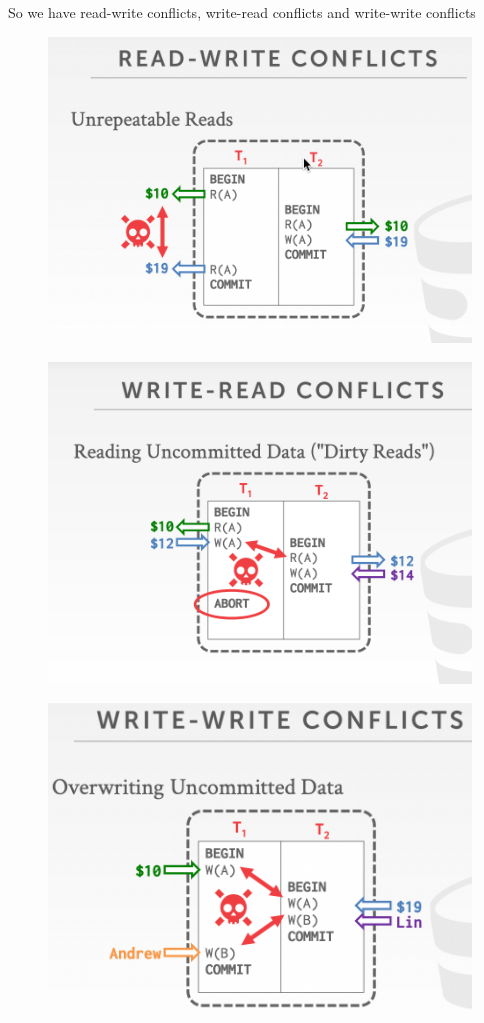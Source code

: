 \documentclass[11pt]{article}
\begin{document}
So we have read-write conflicts, write-read conflicts and write-write conflicts
\begin{figure}[htbp]
\centering
\includegraphics[width=.7\textwidth]{../images/15445/49.png}
\label{}
\end{figure}

\begin{figure}[htbp]
\centering
\includegraphics[width=.7\textwidth]{../images/15445/50.png}
\label{}
\end{figure}

\begin{figure}[htbp]
\centering
\includegraphics[width=.7\textwidth]{../images/15445/51.png}
\label{}
\end{figure}
\end{document}
